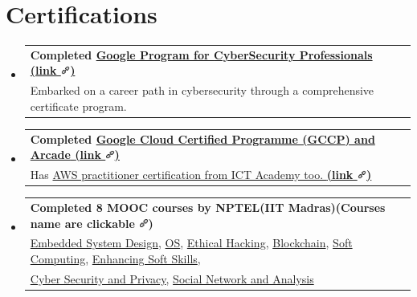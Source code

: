 \documentclass[a4paper,11pt]{article}
\makeatletter
\newcommand{\resumePOR}[3]{
\vspace{0.5mm}\item
    \begin{tabular*}{0.97\textwidth}[t]{l@{\extracolsep{\fill}}r}
        \textbf{#1}\hspace{0.3mm}#2 & \textit{\small{#3}} 
    \end{tabular*}
    \vspace{-2mm}
}
\newcommand{\resumeSubHeadingListStart}{\begin{itemize}[leftmargin=*,labelsep=0mm]}
\newcommand{\resumeSubHeadingListEnd}{\end{itemize}\vspace{2mm}}
\newcommand{\customtext}[1]{{\sffamily\bfseries #1}}
\makeatother
\begin{document}
\section{\textbf{Certifications}}
\vspace{-0.4mm}
\resumeSubHeadingListStart
 \resumePOR{ Completed \href{https://www.coursera.org/user/41d23a6a1b3adac32aa9ec46b489b796}{Google Program for \customtext{\textbf{\textcolor{sand}{CyberSecurity Professionals}}} {\color{gray}\textbf{(link \includegraphics[width=0.3cm,clip]{url.png})}}} } %
     {\\ \thinspace Embarked on a career path in cybersecurity through a comprehensive certificate program. } %
     {} %
    \vspace{-1.5mm}
\resumePOR{ Completed \href{https://www.cloudskillsboost.google/public_profiles/91489762-1602-483b-ab67-1b39c37ef97e}{Google Cloud Certified Programme ({\customtext{\textbf{\textcolor{sand}{GCCP}}}}) and {\customtext{\textbf{\textcolor{sand}{Arcade}}}} {\color{gray}\textbf{(link \includegraphics[width=0.3cm,clip]{url.png})}}}} %
    {\\ \thinspace \thinspace \thinspace Has \href{https://drive.google.com/file/d/1W1SGN5S8B5xBssxEpR7Hf7R4qthaMAJq/view}{AWS practitioner certification from ICT Academy too. {\color{gray}\textbf{(link \includegraphics[width=0.3cm,clip]{url.png})}}}} %
    {} %

\vspace{-1.5mm}
\resumePOR{ Completed {\customtext{\textbf{\textcolor{sand}{8 MOOC}}}} courses by {\customtext{\textbf{\textcolor{sand}{NPTEL}}}}(IIT Madras){\color{gray}\textbf{(Courses name are clickable \includegraphics[width=0.3cm,clip]{url.png})}}} %
    {\\ \thinspace \thinspace \href{https://drive.google.com/file/d/1NNtPU47EDwctv0La5WJ61f8TtA5C4N00/view}{Embedded System Design}, \href{https://drive.google.com/file/d/1ep8HiIOPxlmtNReNDM3sXMoEGXwcTwaq/view}{OS}, \href{https://drive.google.com/file/d/1KUPU6qSUxFanrBwR6eKQG2otpBUHx37s/view}{Ethical Hacking}, \href{https://drive.google.com/file/d/1V7lfHvy9bH8j2tYGKsqHzlkveVSJXazc/view}{Blockchain}, \href{https://drive.google.com/file/d/12imWro24FSbGDvn6VBiS0YYjT1uFIXU7/view}{Soft Computing}, 
	\href{https://drive.google.com/file/d/1NsnSqtSW_yQDYfZV8zclOZWUEt48u8pQ/view}{Enhancing Soft Skills},
	\\ \thinspace \thinspace \href{https://drive.google.com/file/d/1QJ5iCmB-Ika9MRtwK3N__Cm9mOQpMgwA/view}{Cyber Security and Privacy}, \href{https://drive.google.com/file/d/1-QCK_lZAXbsWc8CTXkgXgBNsHD8h2TEC/view}{Social Network and Analysis}} %
    {} %
\resumeSubHeadingListEnd
\vspace{-10.5mm}


\end{document}
